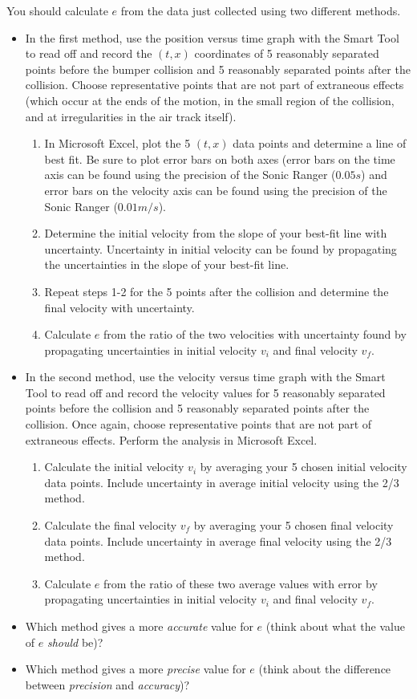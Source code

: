 You should calculate $e$ from the data just collected using two different methods. \myskip
\begin{itemize}
\item In the first method, use the position versus time graph with the Smart Tool to read off and record the $(t,x)$ coordinates of 5 reasonably separated points before the bumper collision and 5 reasonably separated points after the collision.  Choose representative points that are not part of extraneous effects (which occur at the ends of the motion, in the small region of the collision, and at irregularities in the air track itself).
\begin{enumerate}
\item In Microsoft Excel, plot the 5 $(t,x)$ data points and determine a line of best fit. Be sure to plot error bars on both axes (error bars on the time axis can be found using the precision of the Sonic Ranger ($0.05 s$) and error bars on the velocity axis can be found using the precision of the Sonic Ranger ($0.01 m/s$).
\item Determine the initial velocity from the slope of your best-fit line with uncertainty. Uncertainty in initial velocity can be found by propagating the uncertainties in the slope of your best-fit line.
\item    Repeat steps 1-2 for the 5 points after the collision and determine the final velocity with uncertainty.
    \item Calculate $e$ from the ratio of the two velocities with uncertainty found by propagating uncertainties in initial velocity $v_i$ and final velocity $v_f$.
\end{enumerate}

\item In the second method, use the velocity versus time graph with the Smart Tool to read off and record the velocity values for 5 reasonably separated points before the collision and 5 reasonably separated points after the collision.  Once again, choose representative points that are not part of extraneous effects. Perform the analysis in Microsoft Excel.
\begin{enumerate}
\item Calculate the initial velocity $v_i$ by averaging your 5 chosen initial velocity data points. Include uncertainty in average initial velocity using the 2/3 method.
\item Calculate the final velocity $v_f$ by averaging your 5 chosen final velocity data points. Include uncertainty in average final velocity using the 2/3 method.
    \item Calculate $e$ from the ratio of these two average values with error by propagating uncertainties in initial velocity $v_i$ and final velocity $v_f$.
        \end{enumerate}
    \item Which method  gives a more {\it{accurate}} value for $e$ (think about what the value of $e$ {\it{should}} be)?
    \item Which method gives a more {\it{precise}} value for $e$ (think about the difference between {\it{precision}} and {\it{accuracy}})?
\end{itemize}

